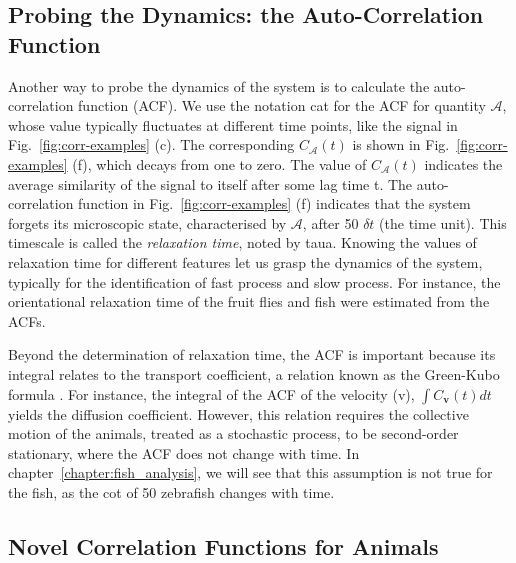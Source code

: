 \documentclass[11pt,twoside]{report}
\begin{document}
\subsection{Probing the Dynamics: the Auto-Correlation Function}
\label{section:intro-corr-acf}

Another way to probe the dynamics of the system is to calculate  the auto-correlation function (\gls{ACF}).
We use the notation \gls{cat} for the ACF for quantity $\mathcal{A}$, whose value typically fluctuates at different time points, like the signal in Fig.~\ref{fig:corr-examples} (c).
The corresponding $C_\mathcal{A}(t)$ is shown in Fig.~\ref{fig:corr-examples} (f), which decays from one to zero. The value of $C_\mathcal{A}(t)$ indicates the average similarity of the signal to itself after some lag time \gls{t}.
The auto-correlation function in Fig.~\ref{fig:corr-examples} (f) indicates that the system forgets its microscopic state, characterised by $\mathcal{A}$, after 50 $\delta t$ (the time unit).
This timescale is called the \emph{relaxation time}, noted by \gls{taua}. Knowing the values of relaxation time for different features let us grasp the dynamics of the system, typically for the identification of fast process and slow process. For instance, the orientational relaxation time of the fruit flies \cite{mendez-valderrama2018} and fish \cite{partridge1981, mwaffo2015, zienkiewicz2015} were estimated from the ACFs.

Beyond the determination of relaxation time, the ACF is important because its integral relates to the transport coefficient, a relation known as the Green-Kubo formula \cite{allen2017, pavliotis2014}. For instance, the integral of the ACF of the velocity (\gls{v}), $\int C_\mathbf{v}(t) dt$ yields the diffusion coefficient. However, this relation requires the collective motion of the animals, treated as a stochastic process, to be second-order stationary, where the ACF does not change with time. In chapter~\ref{chapter:fish_analysis}, we will see that this assumption is not true for the fish, as the \gls{cot} of 50 zebrafish changes with time.


\subsection{Novel Correlation Functions for Animals}
\label{section:intro-corr-special}
\end{document}
